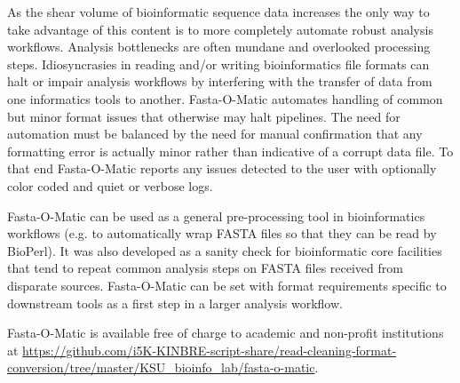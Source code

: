 As the shear volume of bioinformatic sequence data increases the only way to take advantage of this content is to more completely automate robust analysis workflows. Analysis bottlenecks are often mundane and overlooked processing steps. Idiosyncrasies in reading and/or writing bioinformatics file formats can halt or impair analysis workflows by interfering with the transfer of data from one informatics tools to another. Fasta-O-Matic automates handling of common but minor format issues that otherwise may halt pipelines. The need for automation must be balanced by the need for manual confirmation that any formatting error is actually minor rather than indicative of a corrupt data file. To that end Fasta-O-Matic reports any issues detected to the user with optionally color coded and quiet or verbose logs.

Fasta-O-Matic can be used as a general pre-processing tool in bioinformatics workflows (e.g. to automatically wrap FASTA files so that they can be read by BioPerl). It was also developed as a sanity check for bioinformatic core facilities that tend to repeat common analysis steps on FASTA files received from disparate sources. Fasta-O-Matic can be set with format requirements specific to downstream tools as a first step in a larger analysis workflow.

Fasta-O-Matic is available free of charge to academic and non-profit institutions at \url{https://github.com/i5K-KINBRE-script-share/read-cleaning-format-conversion/tree/master/KSU\_bioinfo\_lab/fasta-o-matic}.
  
  
  
  
  
  
  
  